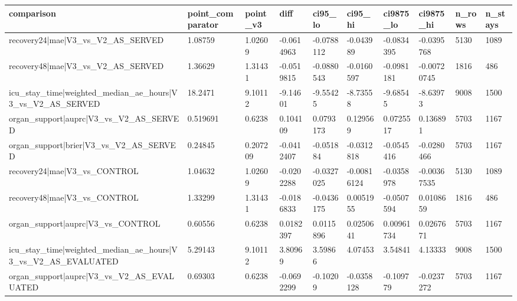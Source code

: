 \begin{tabular}{llllllllll}
\hline
comparison & point\_comparator & point\_v3 & diff & ci95\_lo & ci95\_hi & ci9875\_lo & ci9875\_hi & n\_rows & n\_stays \\
\hline
recovery24|mae|V3\_vs\_V2\_AS\_SERVED & 1.08759 & 1.02609 & -0.0614963 & -0.0788112 & -0.043989 & -0.0834395 & -0.0395768 & 5130 & 1089 \\
recovery48|mae|V3\_vs\_V2\_AS\_SERVED & 1.36629 & 1.31431 & -0.0519815 & -0.0880543 & -0.0160597 & -0.0981181 & -0.00720745 & 1816 & 486 \\
icu\_stay\_time|weighted\_median\_ae\_hours|V3\_vs\_V2\_AS\_SERVED & 18.2471 & 9.10112 & -9.14601 & -9.55425 & -8.73558 & -9.68545 & -8.63973 & 9008 & 1500 \\
organ\_support|auprc|V3\_vs\_V2\_AS\_SERVED & 0.519691 & 0.6238 & 0.104109 & 0.0793173 & 0.129569 & 0.0725517 & 0.136891 & 5703 & 1167 \\
organ\_support|brier|V3\_vs\_V2\_AS\_SERVED & 0.24845 & 0.207209 & -0.0412407 & -0.051884 & -0.0312818 & -0.0545416 & -0.0280466 & 5703 & 1167 \\
recovery24|mae|V3\_vs\_CONTROL & 1.04632 & 1.02609 & -0.0202288 & -0.0327025 & -0.00816124 & -0.0358978 & -0.00367535 & 5130 & 1089 \\
recovery48|mae|V3\_vs\_CONTROL & 1.33299 & 1.31431 & -0.0186833 & -0.0436175 & 0.0051955 & -0.0507594 & 0.0108659 & 1816 & 486 \\
organ\_support|auprc|V3\_vs\_CONTROL & 0.60556 & 0.6238 & 0.0182397 & 0.0115896 & 0.0250641 & 0.00961734 & 0.0267671 & 5703 & 1167 \\
icu\_stay\_time|weighted\_median\_ae\_hours|V3\_vs\_V2\_AS\_EVALUATED & 5.29143 & 9.10112 & 3.80969 & 3.59866 & 4.07453 & 3.54841 & 4.13333 & 9008 & 1500 \\
organ\_support|auprc|V3\_vs\_V2\_AS\_EVALUATED & 0.69303 & 0.6238 & -0.0692299 & -0.10209 & -0.0358128 & -0.109779 & -0.0237272 & 5703 & 1167 \\
\hline
\end{tabular}
